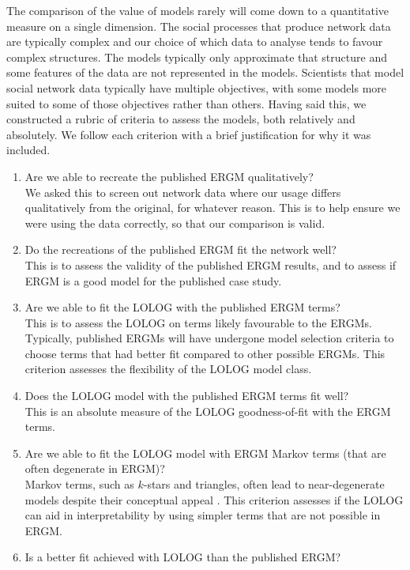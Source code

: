 \documentclass[
]{statsoc}
\begin{document}
The comparison of the value of models rarely will come down to a
quantitative measure on a single dimension. The social processes that
produce network data are typically complex and our choice of which data
to analyse tends to favour complex structures. The models typically only
approximate that structure and some features of the data are not
represented in the models. Scientists that model social network data
typically have multiple objectives, with some models more suited to some
of those objectives rather than others. Having said this, we constructed
a rubric of criteria to assess the models, both relatively and
absolutely. We follow each criterion with a brief justification for why
it was included.

\begin{enumerate}
\item Are we able to recreate the published ERGM qualitatively?\\
We asked this to screen out network data where our usage differs qualitatively from the original, for whatever reason. This is to help ensure we were using the data correctly, so that our comparison is valid.
\item Do the recreations of the published ERGM fit the network well?\\
This is to assess the validity of the published ERGM results, and to assess if ERGM is a good model for the published case study.
\item Are we able to fit the LOLOG with the published ERGM terms?\\
This is to assess the LOLOG on terms likely favourable to the ERGMs. Typically, published ERGMs will have undergone model selection criteria to
choose terms that had better fit compared to other possible ERGMs. This criterion assesses the flexibility of the LOLOG model class.
\item Does the LOLOG model with the published ERGM terms fit well?\\
This is an absolute measure of the LOLOG goodness-of-fit with the ERGM terms.
\item Are we able to fit the LOLOG model with ERGM Markov terms (that are often degenerate in ERGM)?\\
Markov terms, such as $k$-stars and triangles, often lead to near-degenerate models despite their conceptual appeal \citep{FrankStrauss1986}. This criterion assesses if the LOLOG can aid in interpretability by using simpler terms that are not possible in ERGM.
\item Is a better fit achieved with LOLOG than the published ERGM?\\

\end{enumerate}
\end{document}
